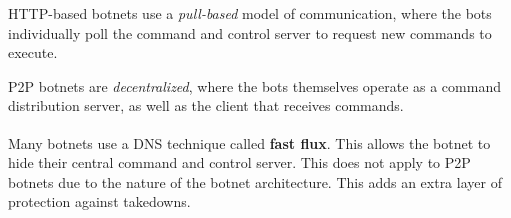 HTTP-based botnets use a \textit{pull-based} model of communication, where the
bots individually poll the command and control server to request new commands
to execute.

P2P botnets are \textit{decentralized}, where the bots themselves operate as a command
distribution server, as well as the client that receives commands.

\vspace{0.5cm}

Many botnets use a DNS technique called \textbf{fast flux}\textsuperscript{\cite{nazario2008net}}. This allows the
botnet to hide their central command and control server. This does not apply
to P2P botnets due to the nature of the botnet architecture. This adds an extra
layer of protection against takedowns.